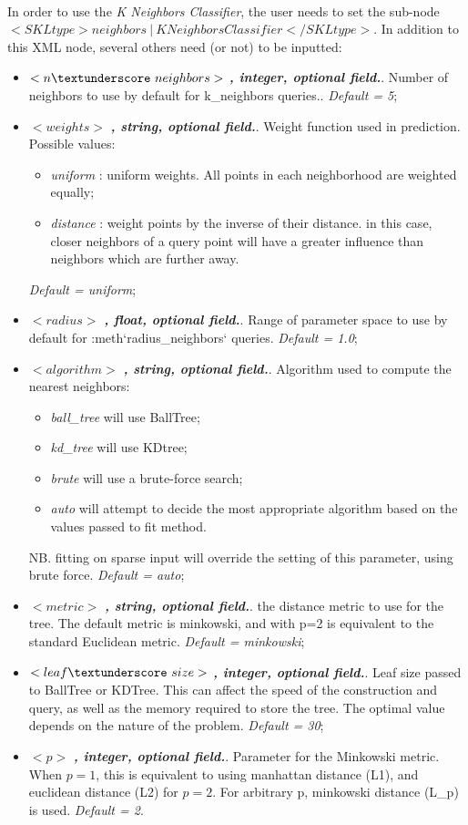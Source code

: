 \\In order to use the   \textit{K Neighbors Classifier}, the user needs to set the sub-node $<SKLtype>neighbors~\vert~KNeighborsClassifier</SKLtype>$. In addition to this XML node, several others need (or not) to be inputted:
\begin{itemize}
\item $<n\textunderscore~neighbors>$ \textbf{\textit{, integer, optional field.}}.  Number of neighbors to use by default for k\_neighbors queries.. \textit{Default = 5};
\item $<weights>$ \textbf{\textit{, string, optional field.}}. Weight function used in prediction. Possible values:
\begin{itemize}
\item \textit{uniform} : uniform weights. All points in each neighborhood are weighted equally;
\item \textit{distance} : weight points by the inverse of their distance. in this case, closer neighbors of a query point will have a greater influence than neighbors which are further away.
\end{itemize}
\textit{Default = uniform};

\item $<radius>$ \textbf{\textit{, float, optional field.}}.  Range of parameter space to use by default for :meth`radius\_neighbors` queries. \textit{Default = 1.0};
\item $<algorithm>$ \textbf{\textit{, string, optional field.}}.  Algorithm used to compute the nearest neighbors:
\begin{itemize}
\item \textit{ball\_tree} will use BallTree;
\item \textit{kd\_tree} will use KDtree;
\item \textit{brute} will use a brute-force search;
\item \textit{auto} will attempt to decide the most appropriate algorithm based on the values passed to fit method.
\end{itemize}
NB. fitting on sparse input will override the setting of this parameter, using brute force. \textit{Default = auto};
\item $<metric>$ \textbf{\textit{, string, optional field.}}.  the distance metric to use for the tree. The default metric is minkowski, and with p=2 is equivalent to the standard Euclidean metric. \textit{Default = minkowski};
\item $<leaf\textunderscore~size>$ \textbf{\textit{, integer, optional field.}}.  Leaf size passed to BallTree or KDTree. This can affect the speed of the construction and query, as well as the memory required to store the tree. The optimal value depends on the nature of the problem. \textit{Default = 30};
\item $<p>$ \textbf{\textit{, integer, optional field.}}.  Parameter for the Minkowski metric. When $p = 1$, this is equivalent to using manhattan distance (L1), and euclidean distance (L2) for $p = 2$. For arbitrary p, minkowski distance (L\_p) is used. \textit{Default = 2}.
\end{itemize}
